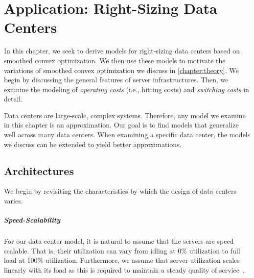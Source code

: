 
\chapter{Application: Right-Sizing Data Centers}\label{chapter:application}

In this chapter, we seek to derive models for right-sizing data centers based on smoothed convex optimization. We then use these models to motivate the variations of smoothed convex optimization we discuss in \cref{chapter:theory}. We begin by discussing the general features of server infrastructures. Then, we examine the modeling of \emph{operating costs} (i.e., hitting costs) and \emph{switching costs} in detail.

Data centers are large-scale, complex systems. Therefore, any model we examine in this chapter is an approximation. Our goal is to find models that generalize well across many data centers. When examining a specific data center, the models we discuss can be extended to yield better approximations.

\section{Architectures}\label{section:application:architectures}

We begin by revisiting the characteristics by which the design of data centers varies.

\paragraph{Speed-Scalability} For our data center model, it is natural to assume that the servers are speed scalable. That is, their utilization can vary from idling at 0\% utilization to full load at 100\% utilization. Furthermore, we assume that server utilization scales linearly with its load as this is required to maintain a steady quality of service~\cite{Bansal2015}.

